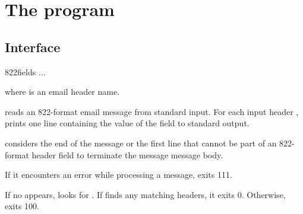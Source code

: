 
\chapter{The  program}

\section{Interface}
\begin{code}
  822fields  ...
\end{code}
where  is an email header name.

 reads an 822-format email message from standard input.
For each input header ,  prints
one line containing the value of the field to standard output.

 considers the end of the message or the first line that
cannot be part of an 822-format header field to terminate the message
message body.

If it encounters an error while processing a message,
 exits 111.

If no  appears,  looks for .
If  finds any matching headers, it exits 0.
Otherwise,  exits 100.


